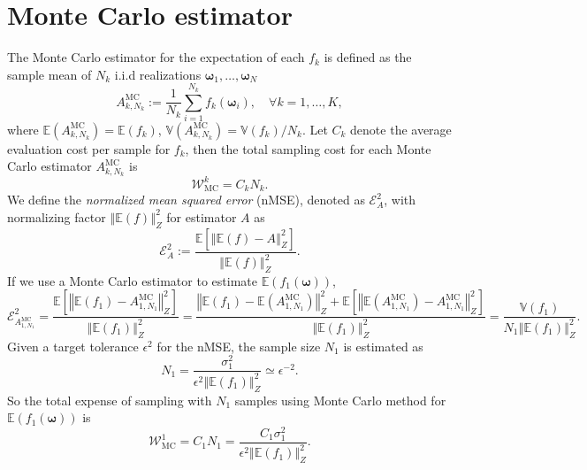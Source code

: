\documentclass[final,3p,times,11pt]{elsarticle}
\begin{document}
\section{Monte Carlo estimator}
The Monte Carlo estimator for the expectation of each $f_k$ is defined as the sample mean of $N_k$ i.i.d realizations $\boldsymbol{\omega}_1,\ldots,\boldsymbol{\omega}_N$
\begin{equation}\label{eq:MC_estimator}
    A^{\text{MC}}_{k,N_k} := \frac{1}{N_k}\sum_{i=1}^{N_k} f_k(\boldsymbol{\omega}_i),\quad \forall k=1,\ldots, K,
\end{equation}
where $\mathbb{E}(A^{\text{MC}}_{k,N_k}) = \mathbb{E}(f_k)$, $\mathbb{V}(A^{\text{MC}}_{k,N_k}) = \mathbb{V}(f_k)/{N_k}$. Let $C_k$ denote the average evaluation cost per sample for $f_k$, then the total sampling cost for each Monte Carlo estimator $A^{\text{MC}}_{k,N_k}$ is 
\[
\mathcal{W}_\text{MC}^k  = C_kN_k.
\]
We define the \textit{normalized mean squared error}  (nMSE), denoted as $\mathcal{E}_{A}^2$, with normalizing factor $\left\Vert\mathbb{E}(f) \right\Vert_{Z}^2$ for estimator $A$ as
 \[
\mathcal{E}_{A}^2:=\frac{\mathbb E\left[\left\Vert\mathbb{E}(f)-A \right\Vert_{Z}^2\right]}{\left\Vert\mathbb{E}(f) \right\Vert_{Z}^2}.
\] 
If we use a Monte Carlo estimator to estimate $\mathbb{E}\left(f_1(\boldsymbol{\omega})\right)$, 
\[
\mathcal{E}_{A^{\text{MC}}_{1,N_1}}^2=\frac{\mathbb E\left[\left\Vert\mathbb{E}(f_1)-A^{\text{MC}}_{1,N_1} \right\Vert_{Z}^2\right]}{\left\Vert\mathbb{E}(f_1) \right\Vert_{Z}^2} = \frac{\left\Vert\mathbb{E}(f_1)-\mathbb{E}(A^{\text{MC}}_{1,N_1}) \right\Vert_{Z}^2+\mathbb E\left[\left\Vert\mathbb{E}(A^{\text{MC}}_{1,N_1})-A^{\text{MC}}_{1,N_1} \right\Vert_{Z}^2\right]}{\left\Vert\mathbb{E}(f_1) \right\Vert_{Z}^2} = \frac{\mathbb{V}\left(f_1\right)}{N_1\left\Vert\mathbb{E}(f_1) \right\Vert_{Z}^2}.
\]
Given a target tolerance $\epsilon^2$ for the nMSE, the sample size $N_1$ is estimated as 
\[
N_1 =  \frac{\sigma_1^2}{\epsilon^2\left\Vert\mathbb{E}(f_1) \right\Vert_{Z}^2}\simeq \epsilon^{-2}.
\]
So the total expense of sampling with $N_1$ samples using Monte Carlo method for $\mathbb{E}\left(f_1(\boldsymbol{\omega})\right)$ is 
\[
\mathcal{W}_\text{MC}^1  = C_1N_1=\frac{C_1\sigma_1^2}{\epsilon^2\left\Vert\mathbb{E}(f_1) \right\Vert_{Z}^2}.
\]
\end{document}
